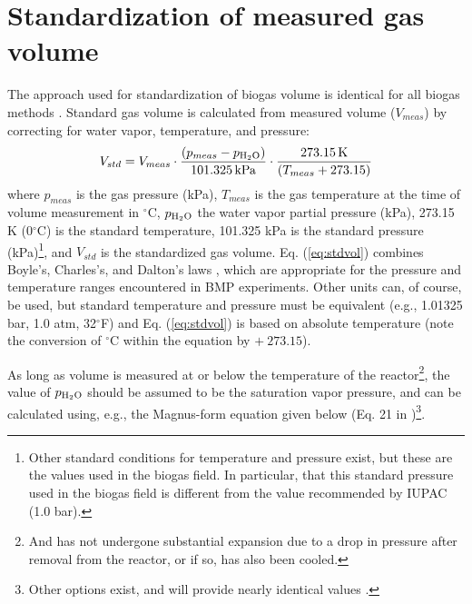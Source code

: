 \documentclass[]{article}
\newcommand{\unit}[1]{\ensuremath{\, \mathrm{#1}}}
\begin{document}
\section{Standardization of measured gas volume}
The approach used for standardization of biogas volume is identical for all biogas methods \citep{BMPdoc202man, BMPdoc204gasdens, BMPdoc201vol, BMPdoc203grav}.
Standard gas volume is calculated from measured volume ($V_{meas}$) by correcting for water vapor, temperature, and pressure:
\begin{equation}
  \label{eq:stdvol}
  V_{std} = V_{meas} \cdot \frac{(p_{meas} - p\textsubscript{H$_2$O})} {101.325 \unit{kPa}} \cdot \frac {273.15 \unit{K}}{(T_{meas} + 273.15)}
\end{equation}
where $p_{meas}$ is the gas pressure (kPa), $T_{meas}$ is the gas temperature at the time of volume measurement in $^\circ$C, $p\textsubscript{H$_2$O}$ the water vapor partial pressure (kPa), 273.15 K (0$^\circ$C) is the standard temperature, 101.325 kPa is the standard pressure (kPa)\footnote{
  Other standard conditions for temperature and pressure exist, but these are the values used in the biogas field.
  In particular, that this standard pressure used in the biogas field is different from the value recommended by IUPAC (1.0 bar).
}, and $V_{std}$ is the standardized gas volume.
Eq. (\ref{eq:stdvol}) combines Boyle's, Charles's, and Dalton's laws \citep{negiTextbookPhysicalChemistry1985}, which are appropriate for the pressure and temperature ranges encountered in BMP experiments.
Other units can, of course, be used, but standard temperature and pressure must be equivalent (e.g., 1.01325 bar, 1.0 atm, 32$^\circ$F) and Eq. (\ref{eq:stdvol}) is based on absolute temperature (note the conversion of $^\circ$C within the equation by $+~273.15$).

As long as volume is measured at or below the temperature of the reactor\footnote{
  And has not undergone substantial expansion due to a drop in pressure after removal from the reactor, or if so, has also been cooled.
}, the value of $p\textsubscript{H$_2$O}$ should be assumed to be the saturation vapor pressure, and can be calculated using, e.g., the Magnus-form equation given below (Eq. 21 in \citet{alduchovImprovedMagnusForm1996})\footnote{
  Other options exist, and will provide nearly identical values \citep{richardsMethodsKineticanalysisMethane1991, vdiFermentationOrganicMaterials2016}.
}.
\end{document}
